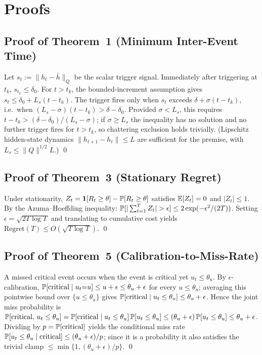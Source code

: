 \section{Proofs}
\label{app:proofs}

\subsection{Proof of Theorem~1 (Minimum Inter-Event Time)}
Let $s_t:=\|h_t-\bar{h}\|_Q$ be the scalar trigger signal. Immediately after triggering at $t_k$, $s_{t_k} \le \delta_0$.
For $t>t_k$, the bounded-increment assumption gives $s_t \le \delta_0 + L_s(t-t_k)$.
The trigger fires only when $s_t$ exceeds $\delta + \sigma(t-t_k)$, i.e.\ when $(L_s - \sigma)(t-t_k) > \delta-\delta_0$.
Provided $\sigma < L_s$, this requires $t-t_k > (\delta-\delta_0)/(L_s - \sigma)$; if $\sigma\ge L_s$ the inequality has no solution and no further trigger fires for $t>t_k$, so chattering exclusion holds trivially. (Lipschitz hidden-state dynamics $\|h_{t+1}-h_t\|\le L$ are sufficient for the premise, with $L_s\le\|Q\|^{1/2}L$.) \qed

\subsection{Proof of Theorem~3 (Stationary Regret)}
Under stationarity, $Z_t = \mathbf{1}[R_t\ge\theta]-\P[R_t\ge\theta]$ satisfies $\E[Z_t]=0$ and $|Z_t|\le 1$.
By the Azuma--Hoeffding inequality: $\P[|\sum_{t=1}^T Z_t|>\epsilon]\le 2\exp(-\epsilon^2/(2T))$.
Setting $\epsilon=\sqrt{2T\log T}$ and translating to cumulative cost yields $\mathrm{Regret}(T)\le O(\sqrt{T\log T})$. \qed

\subsection{Proof of Theorem~5 (Calibration-to-Miss-Rate)}
A missed critical event occurs when the event is critical yet $u_t\le\theta_u$.
By $\epsilon$-calibration, $\P[\text{critical}\mid u_t{=}u]\le u+\epsilon\le\theta_u+\epsilon$ for every $u\le\theta_u$; averaging this pointwise bound over $\{u\le\theta_u\}$ gives $\P[\text{critical}\mid u_t\le\theta_u]\le\theta_u+\epsilon$.
Hence the joint miss probability is $\P[\text{critical},\,u_t\le\theta_u]=\P[\text{critical}\mid u_t\le\theta_u]\,\P[u_t\le\theta_u]\le(\theta_u+\epsilon)\,\P[u_t\le\theta_u]\le\theta_u+\epsilon$.
Dividing by $p=\P[\text{critical}]$ yields the conditional miss rate $\P[u_t\le\theta_u\mid\text{critical}]\le(\theta_u+\epsilon)/p$; since it is a probability it also satisfies the trivial clamp $\le\min\{1,(\theta_u+\epsilon)/p\}$. \qed

